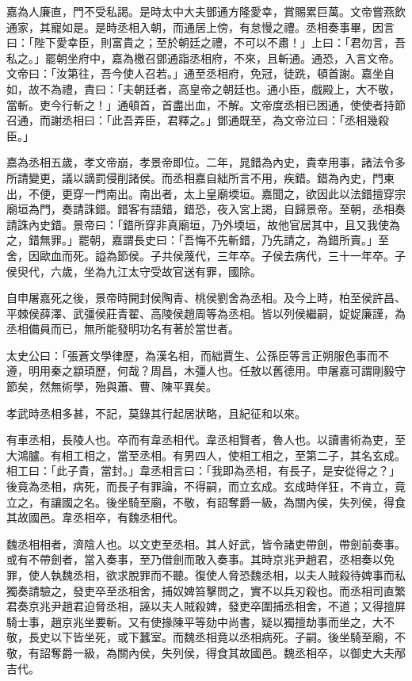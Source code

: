 \begin{pinyinscope}
嘉為人廉直，門不受私謁。是時太中大夫鄧通方隆愛幸，賞賜累巨萬。文帝嘗燕飲通家，其寵如是。是時丞相入朝，而通居上傍，有怠慢之禮。丞相奏事畢，因言曰：「陛下愛幸臣，則富貴之；至於朝廷之禮，不可以不肅！」上曰：「君勿言，吾私之。」罷朝坐府中，嘉為檄召鄧通詣丞相府，不來，且斬通。通恐，入言文帝。文帝曰：「汝第往，吾今使人召若。」通至丞相府，免冠，徒跣，頓首謝。嘉坐自如，故不為禮，責曰：「夫朝廷者，高皇帝之朝廷也。通小臣，戲殿上，大不敬，當斬。吏今行斬之！」通頓首，首盡出血，不解。文帝度丞相已困通，使使者持節召通，而謝丞相曰：「此吾弄臣，君釋之。」鄧通既至，為文帝泣曰：「丞相幾殺臣。」

嘉為丞相五歲，孝文帝崩，孝景帝即位。二年，晁錯為內史，貴幸用事，諸法令多所請變更，議以謫罰侵削諸侯。而丞相嘉自絀所言不用，疾錯。錯為內史，門東出，不便，更穿一門南出。南出者，太上皇廟堧垣。嘉聞之，欲因此以法錯擅穿宗廟垣為門，奏請誅錯。錯客有語錯，錯恐，夜入宮上謁，自歸景帝。至朝，丞相奏請誅內史錯。景帝曰：「錯所穿非真廟垣，乃外堧垣，故他官居其中，且又我使為之，錯無罪。」罷朝，嘉謂長史曰：「吾悔不先斬錯，乃先請之，為錯所賣。」至舍，因歐血而死。謚為節侯。子共侯蔑代，三年卒。子侯去病代，三十一年卒。子侯臾代，六歲，坐為九江太守受故官送有罪，國除。

自申屠嘉死之後，景帝時開封侯陶青、桃侯劉舍為丞相。及今上時，柏至侯許昌、平棘侯薛澤、武彊侯莊青翟、高陵侯趙周等為丞相。皆以列侯繼嗣，娖娖廉謹，為丞相備員而已，無所能發明功名有著於當世者。

太史公曰：「張蒼文學律歷，為漢名相，而絀賈生、公孫臣等言正朔服色事而不遵，明用秦之顓頊歷，何哉？周昌，木彊人也。任敖以舊德用。申屠嘉可謂剛毅守節矣，然無術學，殆與蕭、曹、陳平異矣。

孝武時丞相多甚，不記，莫錄其行起居狀略，且紀征和以來。

有車丞相，長陵人也。卒而有韋丞相代。韋丞相賢者，魯人也。以讀書術為吏，至大鴻臚。有相工相之，當至丞相。有男四人，使相工相之，至第二子，其名玄成。相工曰：「此子貴，當封。」韋丞相言曰：「我即為丞相，有長子，是安從得之？」後竟為丞相，病死，而長子有罪論，不得嗣，而立玄成。玄成時佯狂，不肯立，竟立之，有讓國之名。後坐騎至廟，不敬，有詔奪爵一級，為關內侯，失列侯，得食其故國邑。韋丞相卒，有魏丞相代。

魏丞相相者，濟陰人也。以文吏至丞相。其人好武，皆令諸吏帶劍，帶劍前奏事。或有不帶劍者，當入奏事，至乃借劍而敢入奏事。其時京兆尹趙君，丞相奏以免罪，使人執魏丞相，欲求脫罪而不聽。復使人脅恐魏丞相，以夫人賊殺待婢事而私獨奏請驗之，發吏卒至丞相舍，捕奴婢笞擊問之，實不以兵刃殺也。而丞相司直繁君奏京兆尹趙君迫脅丞相，誣以夫人賊殺婢，發吏卒圍捕丞相舍，不道；又得擅屏騎士事，趙京兆坐要斬。又有使掾陳平等劾中尚書，疑以獨擅劫事而坐之，大不敬，長史以下皆坐死，或下蠶室。而魏丞相竟以丞相病死。子嗣。後坐騎至廟，不敬，有詔奪爵一級，為關內侯，失列侯，得食其故國邑。魏丞相卒，以御史大夫邴吉代。


\end{pinyinscope}
